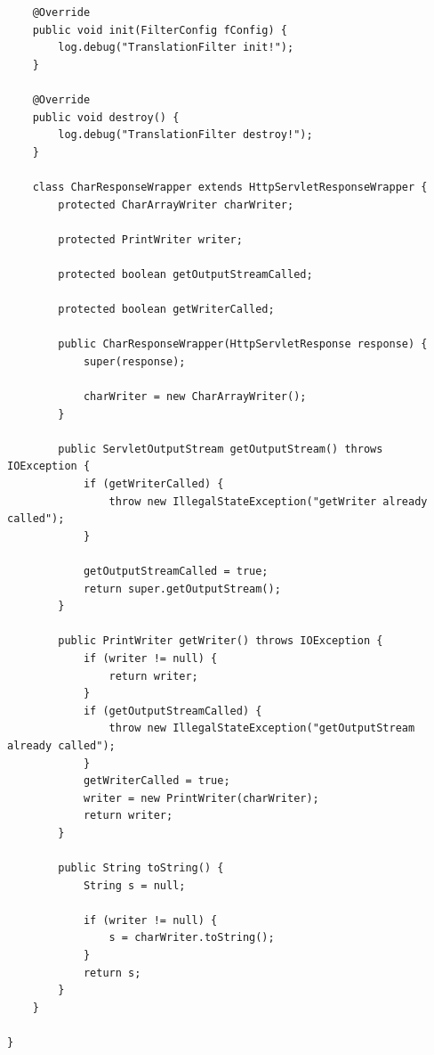\begin{verbatim}
    @Override
    public void init(FilterConfig fConfig) {
        log.debug("TranslationFilter init!");
    }

    @Override
    public void destroy() {
        log.debug("TranslationFilter destroy!");
    }

    class CharResponseWrapper extends HttpServletResponseWrapper {
        protected CharArrayWriter charWriter;

        protected PrintWriter writer;

        protected boolean getOutputStreamCalled;

        protected boolean getWriterCalled;

        public CharResponseWrapper(HttpServletResponse response) {
            super(response);

            charWriter = new CharArrayWriter();
        }

        public ServletOutputStream getOutputStream() throws IOException {
            if (getWriterCalled) {
                throw new IllegalStateException("getWriter already called");
            }

            getOutputStreamCalled = true;
            return super.getOutputStream();
        }

        public PrintWriter getWriter() throws IOException {
            if (writer != null) {
                return writer;
            }
            if (getOutputStreamCalled) {
                throw new IllegalStateException("getOutputStream already called");
            }
            getWriterCalled = true;
            writer = new PrintWriter(charWriter);
            return writer;
        }

        public String toString() {
            String s = null;

            if (writer != null) {
                s = charWriter.toString();
            }
            return s;
        }
    }

}
\end{verbatim}